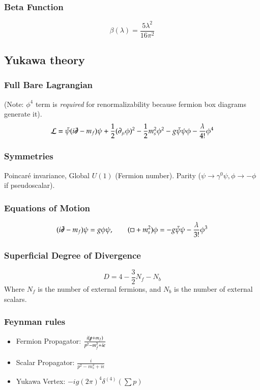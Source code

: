\documentclass{article}
\begin{document}
\subsubsection*{Beta Function}
\begin{equation}
    \beta(\lambda) = \frac{5\lambda^2}{16\pi^2}
\end{equation}
\subsection{Yukawa theory}
\subsubsection*{Full Bare Lagrangian}
(Note: $\phi^4$ term is \textit{required} for renormalizability because fermion box diagrams generate it).
\begin{equation}
    \mathcal{L} = \bar{\psi}(i\slashed{\partial} - m_f)\psi + \frac{1}{2}(\partial_\mu \phi)^2 - \frac{1}{2}m_s^2\phi^2 - g \bar{\psi}\psi\phi - \frac{\lambda}{4!}\phi^4
\end{equation}
\subsubsection*{Symmetries}
Poincar\'{e} invariance, Global $U(1)$ (Fermion number). Parity ($\psi \to \gamma^0 \psi, \phi \to -\phi$ if pseudoscalar).
\subsubsection*{Equations of Motion}
\begin{equation}
    (i\slashed{\partial} - m_f)\psi = g\phi\psi, \qquad (\Box + m_s^2)\phi = -g\bar{\psi}\psi - \frac{\lambda}{3!}\phi^3
\end{equation}
\subsubsection*{Superficial Degree of Divergence}
\begin{equation}
    D = 4 - \frac{3}{2}N_f - N_b
\end{equation}
Where $N_f$ is the number of external fermions, and $N_b$ is the number of external scalars.
\subsubsection*{Feynman rules}
\begin{itemize}
    \item Fermion Propagator: $\frac{i(\slashed{p}+m_f)}{p^2-m_f^2+i\epsilon}$
    \item Scalar Propagator: $\frac{i}{p^2-m_s^2+i\epsilon}$
    \item Yukawa Vertex: $-ig(2\pi)^4\delta^{(4)}(\sum p)$
\end{itemize}
\end{document}
